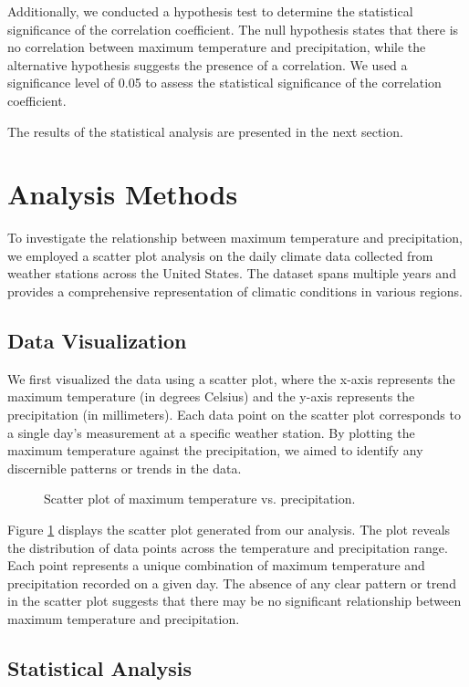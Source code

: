\documentclass{article}
\begin{document}
Additionally, we conducted a hypothesis test to determine the statistical significance of the correlation coefficient. The null hypothesis states that there is no correlation between maximum temperature and precipitation, while the alternative hypothesis suggests the presence of a correlation. We used a significance level of 0.05 to assess the statistical significance of the correlation coefficient.

The results of the statistical analysis are presented in the next section.
\section{Analysis Methods}

To investigate the relationship between maximum temperature and precipitation, we employed a scatter plot analysis on the daily climate data collected from weather stations across the United States. The dataset spans multiple years and provides a comprehensive representation of climatic conditions in various regions.

\subsection{Data Visualization}

We first visualized the data using a scatter plot, where the x-axis represents the maximum temperature (in degrees Celsius) and the y-axis represents the precipitation (in millimeters). Each data point on the scatter plot corresponds to a single day's measurement at a specific weather station. By plotting the maximum temperature against the precipitation, we aimed to identify any discernible patterns or trends in the data.

\begin{figure}[h]
  \centering
  \caption{Scatter plot of maximum temperature vs. precipitation.}
  \label{fig:scatter_plot}
\end{figure}

Figure \ref{fig:scatter_plot} displays the scatter plot generated from our analysis. The plot reveals the distribution of data points across the temperature and precipitation range. Each point represents a unique combination of maximum temperature and precipitation recorded on a given day. The absence of any clear pattern or trend in the scatter plot suggests that there may be no significant relationship between maximum temperature and precipitation.

\subsection{Statistical Analysis}
\end{document}
